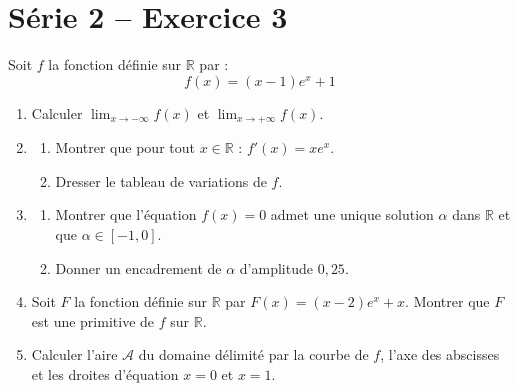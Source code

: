 \section*{Série 2 -- Exercice 3}

Soit $f$ la fonction définie sur $\mathbb{R}$ par :
$$f(x) = (x-1)e^x + 1$$

\begin{enumerate}
\item Calculer $\lim_{x \to -\infty} f(x)$ et $\lim_{x \to +\infty} f(x)$.

\item
\begin{enumerate}
\item Montrer que pour tout $x \in \mathbb{R}$ : $f'(x) = x e^x$.
\item Dresser le tableau de variations de $f$.
\end{enumerate}

\item
\begin{enumerate}
\item Montrer que l'équation $f(x) = 0$ admet une unique solution $\alpha$ dans $\mathbb{R}$
et que $\alpha \in [-1, 0]$.
\item Donner un encadrement de $\alpha$ d'amplitude $0{,}25$.
\end{enumerate}

\item Soit $F$ la fonction définie sur $\mathbb{R}$ par $F(x) = (x-2)e^x + x$.
Montrer que $F$ est une primitive de $f$ sur $\mathbb{R}$.

\item Calculer l'aire $\mathcal{A}$ du domaine délimité par la courbe de $f$, l'axe des abscisses
et les droites d'équation $x = 0$ et $x = 1$.
\end{enumerate}
